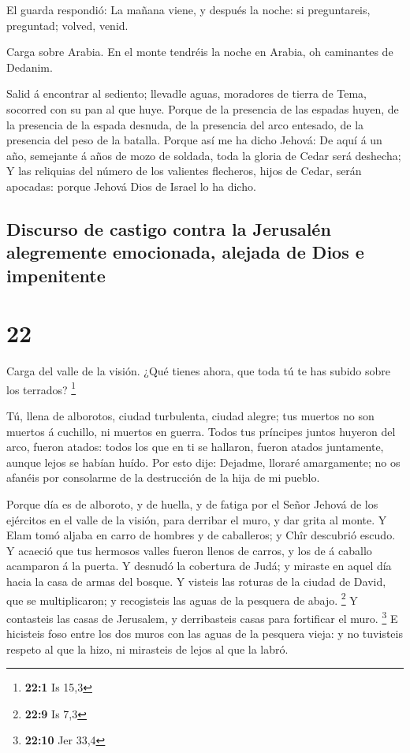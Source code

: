  El guarda respondió: La mañana viene, y después la
noche: si preguntareis, preguntad; volved, venid.

 Carga sobre Arabia. En el monte tendréis la noche en
Arabia, oh caminantes de Dedanim.

 Salid á encontrar al sediento; llevadle aguas, moradores
de tierra de Tema, socorred con su pan al que huye. 
Porque de la presencia de las espadas huyen, de la presencia de la
espada desnuda, de la presencia del arco entesado, de la presencia del
peso de la batalla.  Porque así me ha dicho Jehová: De
aquí á un año, semejante á años de mozo de soldada, toda la gloria de
Cedar será deshecha;  Y las reliquias del número de los
valientes flecheros, hijos de Cedar, serán apocadas: porque Jehová Dios
de Israel lo ha dicho.

\hypertarget{discurso-de-castigo-contra-la-jerusaluxe9n-alegremente-emocionada-alejada-de-dios-e-impenitente}{%
\subsection{Discurso de castigo contra la Jerusalén alegremente
emocionada, alejada de Dios e
impenitente}\label{discurso-de-castigo-contra-la-jerusaluxe9n-alegremente-emocionada-alejada-de-dios-e-impenitente}}

\hypertarget{section-21}{%
\section{22}\label{section-21}}

 Carga del valle de la visión. ¿Qué tienes ahora, que toda
tú te has subido sobre los terrados? \footnote{\textbf{22:1} Is 15,3}

 Tú, llena de alborotos, ciudad turbulenta, ciudad alegre;
tus muertos no son muertos á cuchillo, ni muertos en guerra.
 Todos tus príncipes juntos huyeron del arco, fueron
atados: todos los que en ti se hallaron, fueron atados juntamente,
aunque lejos se habían huído.  Por esto dije: Dejadme,
lloraré amargamente; no os afanéis por consolarme de la destrucción de
la hija de mi pueblo.

 Porque día es de alboroto, y de huella, y de fatiga por
el Señor Jehová de los ejércitos en el valle de la visión, para derribar
el muro, y dar grita al monte.  Y Elam tomó aljaba en
carro de hombres y de caballeros; y Chîr descubrió escudo.
 Y acaeció que tus hermosos valles fueron llenos de
carros, y los de á caballo acamparon á la puerta.  Y
desnudó la cobertura de Judá; y miraste en aquel día hacia la casa de
armas del bosque.  Y visteis las roturas de la ciudad de
David, que se multiplicaron; y recogisteis las aguas de la pesquera de
abajo. \footnote{\textbf{22:9} Is 7,3}  Y contasteis las
casas de Jerusalem, y derribasteis casas para fortificar el muro.
\footnote{\textbf{22:10} Jer 33,4}  E hicisteis foso
entre los dos muros con las aguas de la pesquera vieja: y no tuvisteis
respeto al que la hizo, ni mirasteis de lejos al que la labró.

